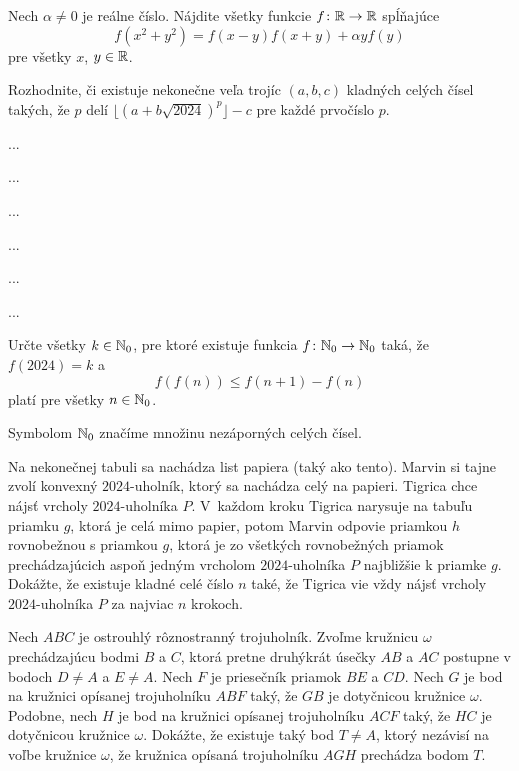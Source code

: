 {%
Nech $\alpha \ne 0$ je reálne číslo. Nájdite všetky funkcie $f \colon \Bbb{R} \to\Bbb{R}$ spĺňajúce
$$
f(x^2+y^2) = f(x-y)f(x+y)+\alpha yf(y)
$$
pre všetky $x$, $y\in\Bbb{R}$.}

{%
Rozhodnite, či existuje nekonečne veľa trojíc $(a, b, c)$ kladných celých čísel takých, že $p$ delí $\lfloor{(a+b\sqrt{2024})^p}\rfloor - c$ pre každé prvočíslo $p$.}

{%
...}

{%
...}

{%
...}

{%
...}

{%
...}

{%
...}

{%
Určte všetky $k\in\Bbb{N}_0$, pre ktoré existuje funkcia $f \colon \Bbb{N}_0 \to \Bbb{N}_0$ taká, že $f(2024)=k$ a
$$
f(f(n)) \le f(n+1) - f(n)
$$
platí pre všetky $n \in \Bbb{N}_0$.

\poznamka
Symbolom $\Bbb{N}_0$ značíme množinu nezáporných celých čísel.}

{%
Na nekonečnej tabuli sa nachádza list papiera (taký ako tento). Marvin si tajne zvolí konvexný $2024$-uholník, ktorý sa nachádza celý na papieri. Tigrica chce nájsť vrcholy $2024$-uholníka $P$. V~každom kroku Tigrica narysuje na tabuľu priamku $g$, ktorá je celá mimo papier, potom Marvin odpovie priamkou $h$ rovnobežnou s priamkou $g$, ktorá je zo všetkých rovnobežných priamok prechádzajúcich aspoň jedným vrcholom $2024$-uholníka $P$ najbližšie k priamke $g$. Dokážte, že existuje kladné celé číslo $n$ také, že Tigrica vie vždy nájsť vrcholy $2024$-uholníka $P$ za najviac $n$ krokoch.}

{%
Nech $ABC$ je ostrouhlý rôznostranný trojuholník.
Zvoľme kružnicu $\omega$ prechádzajúcu bodmi $B$ a $C$, ktorá pretne druhýkrát úsečky $AB$ a $AC$ postupne v bodoch $D\ne A$ a $E\ne A$.
Nech $F$ je priesečník priamok $BE$ a $CD$.
Nech $G$ je bod na kružnici opísanej trojuholníku $ABF$ taký, že $GB$ je dotyčnicou kružnice $\omega$.
Podobne, nech $H$ je bod na kružnici opísanej trojuholníku $ACF$ taký, že $HC$ je dotyčnicou kružnice $\omega$.
Dokážte, že existuje taký bod $T\ne A$, ktorý nezávisí na voľbe kružnice $\omega$, že kružnica opísaná trojuholníku $AGH$ prechádza bodom $T$.}


